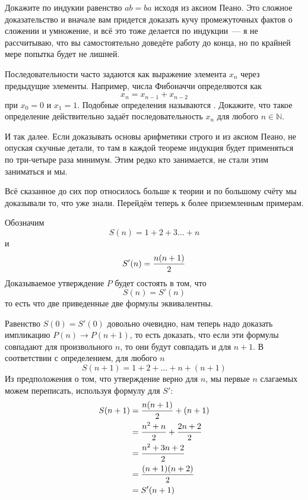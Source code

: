 \begin{exercise}
Докажите по индукии равенство $ab=ba$ исходя из аксиом Пеано. Это сложное доказательство и вначале вам придется доказать кучу промежуточных фактов о сложении и умножение, и всё это тоже делается по индукции~--- я не рассчитываю, что вы самостоятельно доведёте работу до конца, но по крайней мере попытка будет не лишней.
\end{exercise}

\begin{exercise}
Последовательности часто задаются как выражение элемента $x_n$ через предыдущие элементы. Например, числа Фибоначчи определяются как
$$x_n = x_{n-1} + x_{n-2}$$
при $x_0 = 0$ и $x_1 = 1$. Подобные определения называются . Докажите, что такое определение действительно задаёт последовательность $x_n$ для любого $n\in\mathbb{N}$.
\end{exercise}

И так далее. Если доказывать основы арифметики строго и из аксиом Пеано, не опуская скучные детали, то там в каждой теореме индукция будет применяться по три-четыре раза минимум. Этим редко кто занимается, не стали этим заниматься и мы.

Всё сказанное до сих пор относилось больше к теории и по большому счёту мы доказывали то, что уже знали. Перейдём теперь к более приземленным примерам.

\begin{example}Обозначим
$$S(n) = 1 + 2 +3 \ldots + n$$
и
$$S'(n) = {n(n+1)\over 2}$$
Доказываемое утверждение $P$ будет состоять в том, что
$$S(n) = S'(n)$$
то есть что две приведенные две формулы эквивалентны.
\end{example}

Равенство $S(0) = S'(0)$ довольно очевидно, нам теперь надо доказать импликацию $P(n)\to P(n + 1)$, то есть доказать, что если эти формулы совпадают для произвольного $n$, то они будут совпадать и для $n + 1$. В соответствии с определением, для любого $n$
$$S(n + 1) = 1 + 2 + \ldots + n + (n + 1)$$
Из предположения о том, что утверждение верно для $n$, мы первые $n$ слагаемых можем переписать, используя формулу для $S'$:
\begin{align*}
S(n + 1) &= {n(n + 1)\over 2} + (n + 1)\\
	&= {n^2 + n\over 2} + {2n + 2\over 2} \\
	&= {n^ 2 + 3n + 2 \over 2} \\
	&= {(n + 1)(n + 2)\over 2} \\
	&= {S'(n + 1)}
\end{align*}

